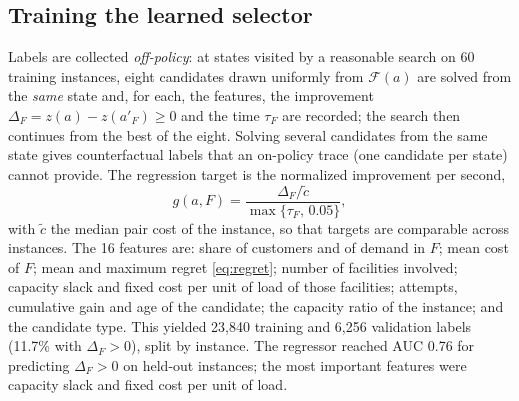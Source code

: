 \subsection{Training the learned selector}\label{sec:training}
Labels are collected \emph{off-policy}: at states visited by a reasonable search on 60 training
instances, eight candidates drawn uniformly from $\mathcal{F}(a)$ are solved from the \emph{same}
state and, for each, the features, the improvement $\Delta_F=z(a)-z(a'_F)\ge0$ and the time
$\tau_F$ are recorded; the search then continues from the best of the eight. Solving several
candidates from the same state gives counterfactual labels that an on-policy trace (one candidate
per state) cannot provide. The regression target is the normalized improvement per second,
\begin{equation}
g(a,F)=\frac{\Delta_F/\tilde c}{\max\{\tau_F,\,0.05\}},
\end{equation}
with $\tilde c$ the median pair cost of the instance, so that targets are comparable across
instances. The 16 features are: share of customers and of demand in $F$; mean cost of $F$; mean
and maximum regret \eqref{eq:regret}; number of facilities involved; capacity slack and fixed
cost per unit of load of those facilities; attempts, cumulative gain and age of the candidate;
the capacity ratio of the instance; and the candidate type. This yielded 23{,}840 training and
6{,}256 validation labels (11.7\% with $\Delta_F>0$), split by instance. The regressor reached
AUC 0.76 for predicting $\Delta_F>0$ on held-out instances; the most important features were
capacity slack and fixed cost per unit of load.
